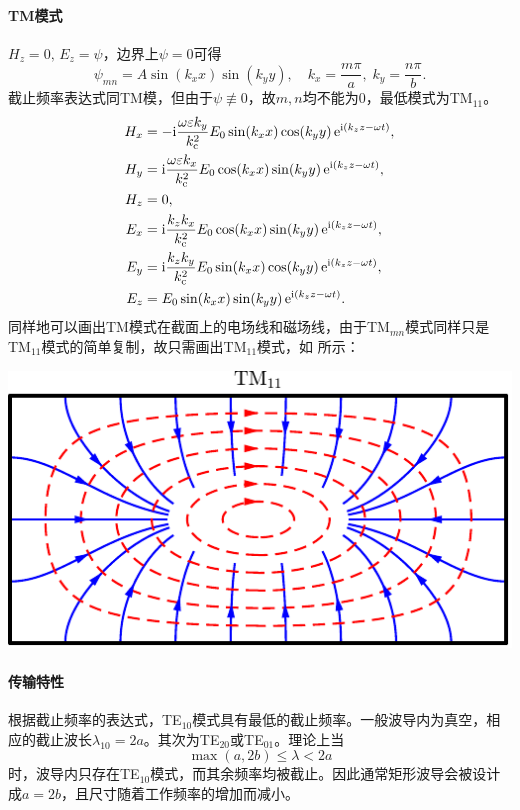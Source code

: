 \paragraph{TM模式}
$H_z=0,\,E_z=\psi$，边界上$\psi=0$可得
\begin{equation}
    \psi_{mn}=A\sin(k_xx)\sin(k_yy),\quad k_x=\frac{m\pi}a,\;k_y=\frac{n\pi}b.
\end{equation}
截止频率表达式同TM模，但由于$\psi\not\equiv 0$，故$m,n$均不能为0，最低模式为TM$_{11}$。
\begin{subequations}
    \begin{align}
        H_x&=-\mathrm{i}\frac{\omega\varepsilon k_y}{k_\text c^2}E_0\sin(k_xx)\cos(k_yy)\mathop{}\!\mathrm{e}^{\mathrm{i}(k_zz-\omega t)},\\
        H_y&=\mathrm{i}\frac{\omega\varepsilon k_x}{k_\text c^2}E_0\cos(k_xx)\sin(k_yy)\mathop{}\!\mathrm{e}^{\mathrm{i}(k_zz-\omega t)},\\
        H_z&=0,\\
        E_x&=\mathrm{i}\frac{k_zk_x}{k_\text c^2}E_0\cos(k_xx)\sin(k_yy)\mathop{}\!\mathrm{e}^{\mathrm{i}(k_zz-\omega t)},\\
        E_y&=\mathrm{i}\frac{k_zk_y}{k_\text c^2}E_0\sin(k_xx)\cos(k_yy)\mathop{}\!\mathrm{e}^{\mathrm{i}(k_zz-\omega t)},\\
        E_z&=E_0\sin(k_xx)\sin(k_yy)\mathop{}\!\mathrm{e}^{\mathrm{i}(k_zz-\omega t)}.
    \end{align}
\end{subequations}
同样地可以画出TM模式在截面上的电场线和磁场线，由于TM$_{mn}$模式同样只是TM$_{11}$模式的简单复制，故只需画出TM$_{11}$模式，如 所示：
\begin{center}
    \includegraphics[width=0.4\linewidth]{graphs/waveguide_rect_TM.pdf}
    \label{fig:waveguide rect TM}
\end{center}

\paragraph{传输特性}

根据截止频率的表达式，TE$_{10}$模式具有最低的截止频率。一般波导内为真空，相应的截止波长$\lambda_{10}=2a$。其次为TE$_{20}$或TE$_{01}$。理论上当
\[
    \max(a,2b)\leq\lambda<2a
\]
时，波导内只存在TE$_{10}$模式，而其余频率均被截止。因此通常矩形波导会被设计成$a=2b$，且尺寸随着工作频率的增加而减小。

